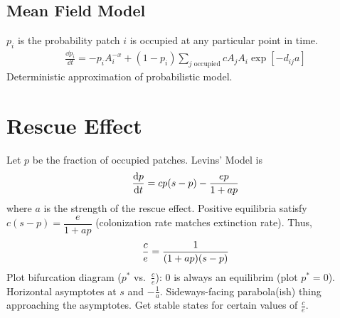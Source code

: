\documentclass{article}
\begin{document}
        \subsection{Mean Field Model}
            $p_i$ is the probability patch $i$ is occupied at any particular point in time.
            \begin{align}
                \frac{\dd p_i}{\dd t} = -p_iA_i^{-x} + (1 - p_i)\sum_{j \text{ occupied}} c A_jA_i\exp[-d_{ij}a]
            \end{align}
            Deterministic approximation of probabilistic model.

    \section{Rescue Effect}
        Let $p$ be the fraction of occupied patches. Levins' Model is
        \begin{align}
            \frac{\dd p}{\dd t} = cp\qty(s - p) - \frac{ep}{1 + ap}
        \end{align}
        where $a$ is the strength of the rescue effect.  Positive equilibria satisfy $c(s - p) = \dfrac{e}{1 + ap}$ (colonization rate matches extinction rate).  Thus,
        \begin{align}
            \frac{c}{e} = \frac{1}{\qty(1 + ap)\qty(s - p)}
        \end{align}
        Plot bifurcation diagram ($p^*$ vs.~$\frac{c}{e}$): $0$ is always an equilibrim (plot $p^* = 0$).  Horizontal asymptotes at $s$ and $-\frac{1}{a}$.  Sideways-facing parabola(ish) thing approaching the asymptotes.  Get stable states for certain values of $\frac{c}{e}$.
\end{document}
